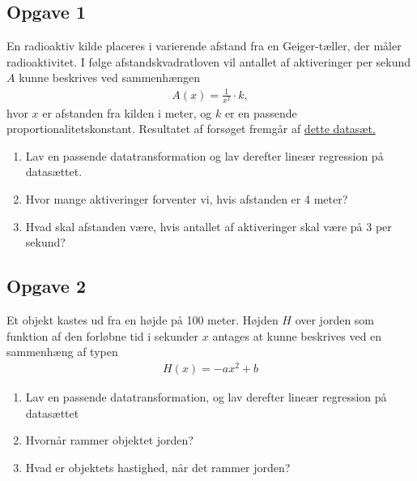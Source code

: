 \documentclass[12pt]{article}
\begin{document}



\subsection*{Opgave 1}

En radioaktiv kilde placeres i varierende afstand fra en Geiger-tæller, der måler radioaktivitet. I følge afstandskvadratloven vil antallet af aktiveringer per sekund $A$ kunne beskrives ved sammenhængen
\begin{align*}
	A(x) = \frac{1}{x^2}\cdot k,
\end{align*}
hvor $x$ er afstanden fra kilden i meter, og $k$ er en passende proportionalitetskonstant. Resultatet af forsøget fremgår af \href{}{dette datasæt.}

\begin{enumerate}[label=\roman*)]
	\item Lav en passende datatransformation og lav derefter lineær regression på datasættet.
	\item Hvor mange aktiveringer forventer vi, hvis afstanden er 4 meter?
	\item Hvad skal afstanden være, hvis antallet af aktiveringer skal være på 3 per sekund?
\end{enumerate}

\subsection*{Opgave 2}

Et objekt kastes ud fra en højde på 100 meter. Højden $H$ over jorden som funktion af den forløbne tid i sekunder $x$ antages at kunne beskrives ved en sammenhæng af typen
\begin{align*}
	H(x) = -ax^2 + b
\end{align*}
\begin{enumerate}[label=\roman*)]
	\item Lav en passende datatransformation, og lav derefter lineær regression på datasættet
	\item Hvornår rammer objektet jorden?
	\item Hvad er objektets hastighed, når det rammer jorden?
\end{enumerate}
\end{document}
